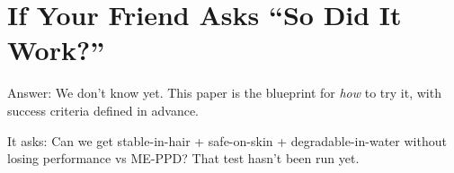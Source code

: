 \documentclass[11pt,a4paper]{article}
\begin{document}
\section{If Your Friend Asks ``So Did It Work?''}
Answer: We don't know yet. This paper is the blueprint for \emph{how} to try it, with success criteria defined in advance.

It asks: Can we get stable-in-hair + safe-on-skin + degradable-in-water without losing performance vs ME-PPD? That test hasn't been run yet.
\end{document}
